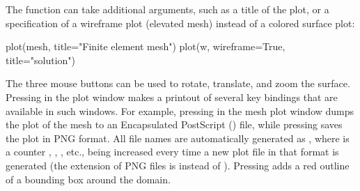 The  function can take additional arguments, such as a title
of the plot, or a specification of a wireframe plot (elevated mesh)
instead of a colored surface plot:
\begin{python}
plot(mesh, title="Finite element mesh")
plot(w, wireframe=True, title="solution")
\end{python}

The three mouse buttons can be used to rotate, translate, and zoom
the surface.  Pressing  in the plot window makes a printout of
several key bindings that are available in such windows. For example,
pressing  in the mesh plot window dumps the plot of the mesh to an
Encapsulated PostScript () file, while pressing  saves
the plot in PNG format.  All file names are automatically generated as
, where  is a counter , ,
, etc., being increased every time a new plot file in that
format is generated (the extension of PNG files is  instead
of ).  Pressing  adds a red outline of a bounding box
around the domain.

